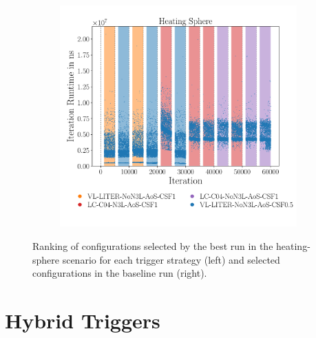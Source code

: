 \begin{figure}[htpb]
\begin{subfigure}{0.5\textwidth}
	\end{subfigure}%
	\begin{subfigure}{0.5\textwidth}
		\centering
		\includegraphics[width=\textwidth]{./Figures/plots/heating-sphere_configs_static.pdf}
		\vspace*{-1.075cm}
	\end{subfigure}
	\caption{Ranking of configurations selected by the best run in the heating-sphere scenario for each trigger strategy (left) and selected configurations in the baseline run (right).}
	\label{fig:hs_optimality}
\end{figure}


\newpage
\section{Hybrid Triggers}
\label{sec:liveinfo_benchmarks}

